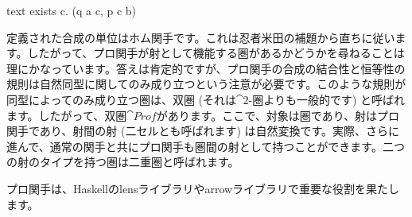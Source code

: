 \begin{snip}{text}
exists c. (q a c, p c b)
\end{snip}
定義された合成の単位はホム関手です。これは忍者米田の補題から直ちに従います。したがって、プロ関手が射として機能する圏があるかどうかを尋ねることは理にかなっています。答えは肯定的ですが、プロ関手の合成の結合性と恒等性の規則は自然同型に関してのみ成り立つという注意が必要です。このような規則が同型によってのみ成り立つ圏は、双圏 (それは$\cat{2}$-圏よりも一般的です) と呼ばれます。したがって、双圏$\cat{Prof}$があります。ここで、対象は圏であり、射はプロ関手であり、射間の射 (二セルとも呼ばれます) は自然変換です。実際、さらに進んで、通常の関手と共にプロ関手も圏間の射として持つことができます。二つの射のタイプを持つ圏は二重圏と呼ばれます。

プロ関手は、Haskellのlensライブラリやarrowライブラリで重要な役割を果たします。


